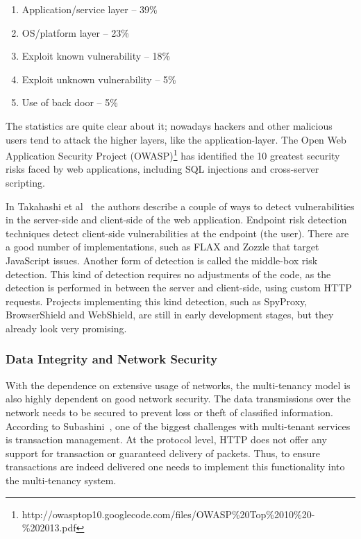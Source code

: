 \begin{enumerate}
    \item Application/service layer – 39\%
    \item OS/platform layer – 23\%
    \item Exploit known vulnerability – 18\%
    \item Exploit unknown vulnerability – 5\%
    \item Use of back door – 5\%
\end{enumerate}

The statistics are quite clear about it; nowadays hackers and other malicious users tend to attack the higher layers, like the application-layer. 
The Open Web Application Security Project (OWASP)\footnote{http://owasptop10.googlecode.com/files/OWASP\%20Top\%2010\%20-\%202013.pdf} has identified the 10 greatest security risks faced by web applications, including SQL injections and cross-server scripting.

In Takahashi et al~\cite{Takahashi2012Security} the authors describe a couple of ways to detect vulnerabilities in the server-side and client-side of the web application. 
Endpoint risk detection techniques detect client-side vulnerabilities at the endpoint (the user). 
There are a good number of implementations, such as FLAX and Zozzle that target JavaScript issues. 
Another form of detection is called the middle-box risk detection. 
This kind of detection requires no adjustments of the code, as the detection is performed in between the server and client-side, using custom HTTP requests. 
Projects implementing this kind detection, such as SpyProxy, BrowserShield and WebShield, are still in early development stages, but they already look very promising.

\subsubsection{Data Integrity and Network Security}
With the dependence on extensive usage of networks, the multi-tenancy model is also highly dependent on good network security.  
The data transmissions over the network needs to be secured to prevent loss or theft of classified information. 
According to Subashini~\cite{Subashini2011Security}, one of the biggest challenges with multi-tenant services is transaction management. 
At the protocol level, HTTP does not offer any support for transaction or guaranteed delivery of packets. 
Thus, to ensure transactions are indeed delivered one needs to implement this functionality into the multi-tenancy system.

